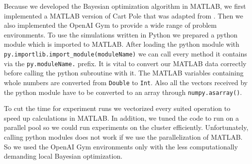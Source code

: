 Because we developed the Bayesian optimization algorithm in MATLAB, we first implemented a MATLAB version of Cart Pole that was adapted from \cite{joseCode}. Then we also implemented the OpenAI Gym \cite{DBLP:journals/corr/BrockmanCPSSTZ16} to provide a wide range of problem environments. To use the simulations written in Python we prepared a python module which is imported to MATLAB. After loading the python module with \verb|py.importlib.import_module(moduleName)| we can call every method it contains via the \verb|py.moduleName.| prefix. It is vital to convert our MATLAB data correctly before calling the python subroutine with it. The MATLAB variables containing whole numbers are converted from \verb|Double| to \verb|Int|. Also all the vectors received by the python module have to be converted to an array through \verb|numpy.asarray()|.

To cut the time for experiment runs we vectorized every suited operation to speed up calculations in MATLAB. In addition, we tuned the code to run on a parallel pool so we could run experiments on the cluster efficiently. Unfortunately, calling python modules does not work if we use the parallelization of MATLAB. So we used the OpenAI Gym environments only with the less computationally demanding local Bayesian optimization.\\

%

